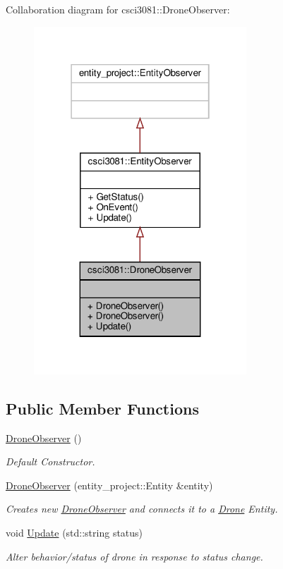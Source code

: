 Collaboration diagram for csci3081\+:\+:Drone\+Observer\+:\nopagebreak
\begin{figure}[H]
\begin{center}
\leavevmode
\includegraphics[width=226pt]{classcsci3081_1_1DroneObserver__coll__graph}
\end{center}
\end{figure}
\subsection*{Public Member Functions}
\begin{DoxyCompactItemize}
\item 
\mbox{\label{classcsci3081_1_1DroneObserver_a44ea52d14f083b4b1d820bc7adf03c7a}} 
\hyperlink{classcsci3081_1_1DroneObserver_a44ea52d14f083b4b1d820bc7adf03c7a}{Drone\+Observer} ()
\begin{DoxyCompactList}\small\item\em Default Constructor. \end{DoxyCompactList}\item 
\hyperlink{classcsci3081_1_1DroneObserver_ad065c567a9ae5d96fd69c70b45a39426}{Drone\+Observer} (entity\+\_\+project\+::\+Entity \&entity)
\begin{DoxyCompactList}\small\item\em Creates new \hyperlink{classcsci3081_1_1DroneObserver}{Drone\+Observer} and connects it to a \hyperlink{classcsci3081_1_1Drone}{Drone} Entity. \end{DoxyCompactList}\item 
void \hyperlink{classcsci3081_1_1DroneObserver_a54e1312bb116755bfa2b9a07c04632f7}{Update} (std\+::string status)
\begin{DoxyCompactList}\small\item\em Alter behavior/status of drone in response to status change. \end{DoxyCompactList}\end{DoxyCompactItemize}


